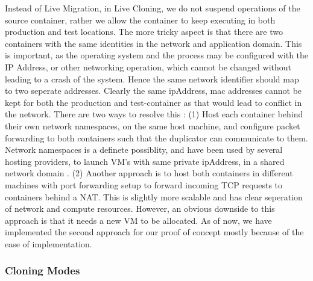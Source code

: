 Instead of Live Migration, in Live Cloning, we do not suspend operations of the source container, rather we allow the container to keep executing in both production and test locations.
The more tricky aspect is that there are two containers with the same identities in the network and application domain. 
This is important, as the operating system and the process may be configured with the IP Address, or other networking operation, which cannot be changed without leading to a crash of the system.
Hence the same network identifier should map to two seperate addresses.
Clearly the same ipAddress, mac addresses cannot be kept for both the production and test-container as that would lead to conflict in the network. 
There are two ways to resolve this : 
(1) Host each container behind their own network namespaces, on the same host machine, and configure packet forwarding to both containers such that the duplicator can communicate to them. 
Network namespaces is a definete possiblity, and have been used by several hosting providers, to launch VM's with same private ipAddress, in a shared network domain \cite{OpenStack}. 
(2) Another approach is to host both containers in different machines with port forwarding setup to forward incoming TCP requests to containers behind a NAT. 
This is slightly more scalable and has clear seperation of network and compute resources. 
However, an obvious downside to this approach is that it needs a new VM to be allocated.
As of now, we have implemented the second approach for our proof of concept mostly because of the ease of implementation.
%

\subsubsection{Cloning Modes}

